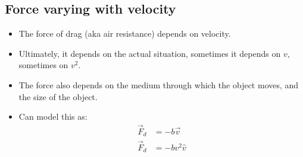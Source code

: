 \documentclass[aspectratio=169,
hyperref={colorlinks,urlcolor=blue}
]{beamer}
\begin{document}
\subsection{Force varying with velocity}
\label{subsec:forcevaryingwithvelocity}
{
\begin{itemize}
\item The force of drag (aka air resistance) depends on velocity.
\item Ultimately, it depends on the actual situation, sometimes it depends on $v$, sometimes on $v^2$.
\item The force also depends on the medium through which the object moves, and the size of the object.
\item Can model this as:
\begin{align*}
\vec F_d&=-b\vec v\\
\vec F_d&=-bv^2\hat v\\
\end{align*}
\end{itemize}
}
{
\begin{center}
\end{center}
}


\end{document}
